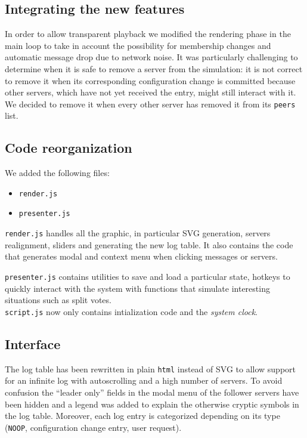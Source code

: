 \subsection{Integrating the new features}
In order to allow transparent playback we modified the rendering phase in the main loop to take in account the possibility for
membership changes and automatic message drop due to network noise.
It was particularly challenging to determine when it is safe to remove a server
from the simulation: it is not correct to remove it when its corresponding configuration change is committed because
other servers, which have not yet received the entry, might still interact with it.
We decided to remove it when every other server has removed it from its \texttt{peers} list.

\subsection{Code reorganization}
We added the following files:
\begin{itemize}
\item \texttt{render.js}
\item \texttt{presenter.js}
\end{itemize}

\texttt{render.js} handles all the graphic, in particular SVG generation, servers realignment, sliders and generating the new log table. It also contains the code that generates modal and context menu when clicking messages or servers.

\texttt{presenter.js} contains utilities to save and load a particular state, hotkeys to quickly interact with the system with functions that simulate interesting situations such as split votes.\\

\texttt{script.js} now only contains intialization code and the \emph{system clock}.


\subsection{Interface}
The log table has been rewritten in plain \texttt{html} instead of SVG to allow support for an infinite log with autoscrolling and a high number of servers.
To avoid confusion the ``leader only'' fields in the modal menu of the
follower servers have been hidden and a legend was added to explain the
otherwise cryptic symbols in the log table. Moreover, each log entry
is categorized depending on its type (\texttt{NOOP}, configuration change entry, user request).

